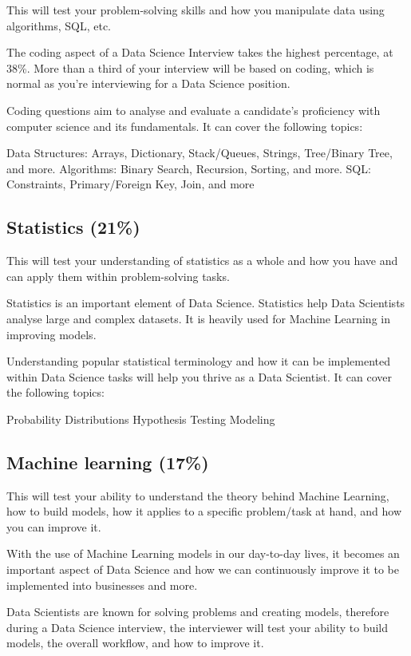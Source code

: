 \documentclass[
]{book}
\begin{document}
This will test your problem-solving skills and how you manipulate data using algorithms, SQL, etc.

The coding aspect of a Data Science Interview takes the highest percentage, at 38\%. More than a third of your interview will be based on coding, which is normal as you're interviewing for a Data Science position.

Coding questions aim to analyse and evaluate a candidate's proficiency with computer science and its fundamentals. It can cover the following topics:

Data Structures: Arrays, Dictionary, Stack/Queues, Strings, Tree/Binary Tree, and more.
Algorithms: Binary Search, Recursion, Sorting, and more.
SQL: Constraints, Primary/Foreign Key, Join, and more

\hypertarget{statistics-21}{%
\subsection{Statistics (21\%)}\label{statistics-21}}

This will test your understanding of statistics as a whole and how you have and can apply them within problem-solving tasks.

Statistics is an important element of Data Science. Statistics help Data Scientists analyse large and complex datasets. It is heavily used for Machine Learning in improving models.

Understanding popular statistical terminology and how it can be implemented within Data Science tasks will help you thrive as a Data Scientist. It can cover the following topics:

Probability Distributions
Hypothesis Testing
Modeling

\hypertarget{machine-learning-17}{%
\subsection{Machine learning (17\%)}\label{machine-learning-17}}

This will test your ability to understand the theory behind Machine Learning, how to build models, how it applies to a specific problem/task at hand, and how you can improve it.

With the use of Machine Learning models in our day-to-day lives, it becomes an important aspect of Data Science and how we can continuously improve it to be implemented into businesses and more.

Data Scientists are known for solving problems and creating models, therefore during a Data Science interview, the interviewer will test your ability to build models, the overall workflow, and how to improve it.
\end{document}

